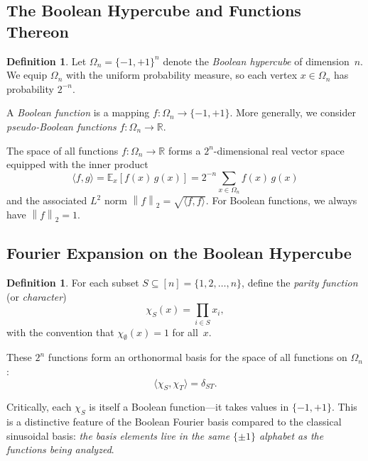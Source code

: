 \documentclass[12pt,a4paper]{article}
\theoremstyle{plain}
\theoremstyle{definition}
\newtheorem{definition}[theorem]{Definition}
\theoremstyle{remark}
\newcommand{\R}{\mathbb{R}}
\newcommand{\E}{\mathbb{E}}
\newcommand{\pmone}{\{-1,+1\}}
\newcommand{\ip}[2]{\langle #1, #2 \rangle}
\newcommand{\norm}[1]{\left\| #1 \right\|}
\begin{document}
\subsection{The Boolean Hypercube and Functions Thereon}\label{sec:hypercube}

\begin{definition}
Let $\Omega_n = \pmone^n$ denote the \emph{Boolean hypercube} of dimension~$n$. We equip $\Omega_n$ with the uniform probability measure, so each vertex $x \in \Omega_n$ has probability $2^{-n}$.
\end{definition}

A \emph{Boolean function} is a mapping $f \colon \Omega_n \to \pmone$. More generally, we consider \emph{pseudo-Boolean functions} $f \colon \Omega_n \to \R$.

The space of all functions $f \colon \Omega_n \to \R$ forms a $2^n$-dimensional real vector space equipped with the inner product
\begin{equation}\label{eq:inner-product}
    \ip{f}{g} = \E_x[f(x)\, g(x)] = 2^{-n} \sum_{x \in \Omega_n} f(x)\, g(x)
\end{equation}
and the associated $L^2$ norm $\norm{f}_2 = \sqrt{\ip{f}{f}}$. For Boolean functions, we always have $\norm{f}_2 = 1$.


\subsection{Fourier Expansion on the Boolean Hypercube}\label{sec:fourier-expansion}

\begin{definition}
For each subset $S \subseteq [n] = \{1, 2, \ldots, n\}$, define the \emph{parity function} (or \emph{character})
\begin{equation}\label{eq:parity}
    \chi_S(x) = \prod_{i \in S} x_i,
\end{equation}
with the convention that $\chi_\emptyset(x) = 1$ for all~$x$.
\end{definition}

These $2^n$ functions form an orthonormal basis for the space of all functions on $\Omega_n$:
\begin{equation}\label{eq:orthonormality}
    \ip{\chi_S}{\chi_T} = \delta_{ST}.
\end{equation}

Critically, each $\chi_S$ is itself a Boolean function---it takes values in $\pmone$. This is a distinctive feature of the Boolean Fourier basis compared to the classical sinusoidal basis: \emph{the basis elements live in the same $\{\pm 1\}$ alphabet as the functions being analyzed}.
\end{document}
